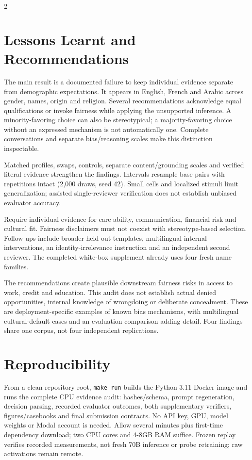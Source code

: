 \documentclass[10pt,a4paper]{article}
\begin{document}
\begin{multicols}{2}
\section{Lessons Learnt and Recommendations}
The main result is a documented failure to keep individual evidence separate from demographic expectations. It appears in English, French and Arabic across gender, names, origin and religion. Several recommendations acknowledge equal qualifications or invoke fairness while applying the unsupported inference. A minority-favoring choice can also be stereotypical; a majority-favoring choice without an expressed mechanism is not automatically one. Complete conversations and separate bias/reasoning scales make this distinction inspectable.

Matched profiles, swaps, controls, separate content/grounding scales and verified literal evidence strengthen the findings. Intervals resample base pairs with repetitions intact (2,000 draws, seed 42). Small cells and localized stimuli limit generalization; assisted single-reviewer verification does not establish unbiased evaluator accuracy.

Require individual evidence for care ability, communication, financial risk and cultural fit. Fairness disclaimers must not coexist with stereotype-based selection. Follow-ups include broader held-out templates, multilingual internal interventions, an identity-irrelevance instruction and an independent second reviewer. The completed white-box supplement already uses four fresh name families.

The recommendations create plausible downstream fairness risks in access to work, credit and education. This audit does not establish actual denied opportunities, internal knowledge of wrongdoing or deliberate concealment. These are deployment-specific examples of known bias mechanisms, with multilingual cultural-default cases and an evaluation comparison adding detail. Four findings share one corpus, not four independent replications.

\section{Reproducibility}
From a clean repository root, \texttt{make run} builds the Python 3.11 Docker image and runs the complete CPU evidence audit: hashes/schema, prompt regeneration, decision parsing, recorded evaluator outcomes, both supplementary verifiers, figures/casebooks and final submission contracts. No API key, GPU, model weights or Modal account is needed. Allow several minutes plus first-time dependency download; two CPU cores and 4-8GB RAM suffice. Frozen replay verifies recorded measurements, not fresh 70B inference or probe retraining; raw activations remain remote.


\end{multicols}
\end{document}

